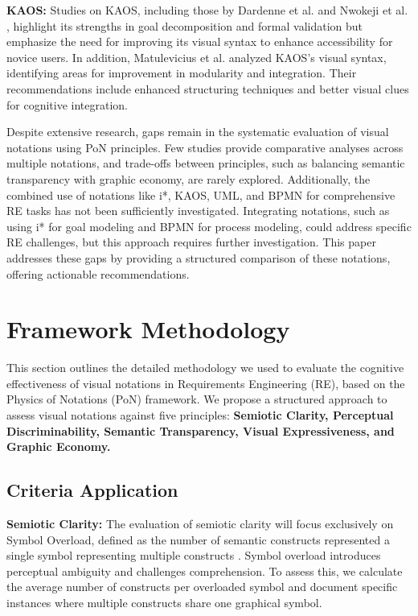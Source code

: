 \documentclass[runningheads]{llncs}
\begin{document}
\textbf{KAOS:} Studies on KAOS, including those by Dardenne et al. and Nwokeji et al. \cite{Dardenne1993, Nwokeji2013}, highlight its strengths in goal decomposition and formal validation but emphasize the need for improving its visual syntax to enhance accessibility for novice users. In addition, Matulevicius et al. \cite{Matulevicius2007} analyzed KAOS's visual syntax, identifying areas for improvement in modularity and integration. Their recommendations include enhanced structuring techniques and better visual clues for cognitive integration.

Despite extensive research, gaps remain in the systematic evaluation of visual notations using PoN principles. Few studies provide comparative analyses across multiple notations, and trade-offs between principles, such as balancing semantic transparency with graphic economy, are rarely explored. Additionally, the combined use of notations like i*, KAOS, UML, and BPMN for comprehensive RE tasks has not been sufficiently investigated.  Integrating notations, such as using i* for goal modeling and BPMN for process modeling, could address specific RE challenges, but this approach requires further investigation. This paper addresses these gaps by providing a structured comparison of these notations, offering actionable recommendations.

\section{Framework Methodology}

This section outlines the detailed methodology we used to evaluate the cognitive effectiveness of visual notations in Requirements Engineering (RE), based on the Physics of Notations (PoN) framework. We propose a structured approach to assess visual notations against five principles: \textbf{Semiotic Clarity, Perceptual Discriminability, Semantic Transparency, Visual Expressiveness, and Graphic Economy.}

\subsection{Criteria Application}
\textbf{Semiotic Clarity:}
The evaluation of semiotic clarity will focus exclusively on Symbol Overload, defined as the number of semantic constructs represented a single symbol representing multiple constructs \cite{Moody2009, Moody2010}. Symbol overload introduces perceptual ambiguity and challenges comprehension. To assess this, we calculate the average number of constructs per overloaded symbol and document specific instances where multiple constructs share one graphical symbol. 
\end{document}
